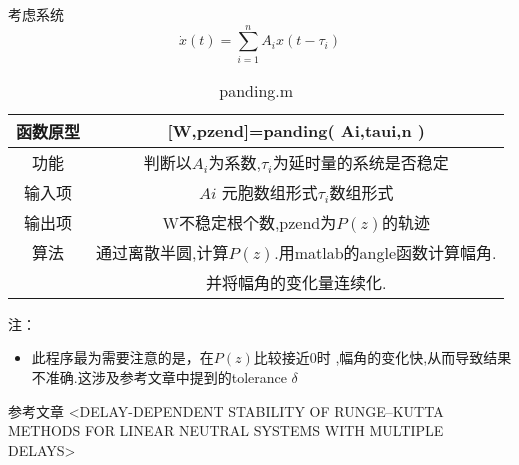 \documentclass[11pt,a4paper]{ctexart}
\begin{document}
考虑系统
$$\dot{x}(t)=\sum_{i=1}^{n}A_ix(t-\tau_i)$$



\begin{table}[htbp]
\caption{panding.m}  %
	\label{table1}  %
	\begin{tabular}{|c|c|} 
\hline
函数原型& [W,pzend]=panding( Ai,taui,n  )\\
\hline
功能& 判断以$A_i$为系数,$\tau_i$为延时量的系统是否稳定\\
\hline
输入项& $Ai$ 元胞数组形式$\tau_i$数组形式\\
\hline
输出项&W不稳定根个数,pzend为$P(z)$的轨迹\\
\hline
算法&通过离散半圆,计算$P(z)$.用matlab的angle函数计算幅角.\\
&并将幅角的变化量连续化.\\
\hline
\end{tabular}
\end{table}
注：
\begin{itemize}
\item 此程序最为需要注意的是，在$P(z)$比较接近$0$时 ,幅角的变化快,从而导致结果不准确.这涉及参考文章中提到的tolerance $δ$
\end{itemize}

参考文章
<DELAY-DEPENDENT STABILITY OF RUNGE–KUTTA
METHODS FOR LINEAR NEUTRAL SYSTEMS
WITH MULTIPLE DELAYS>
\end{document}
